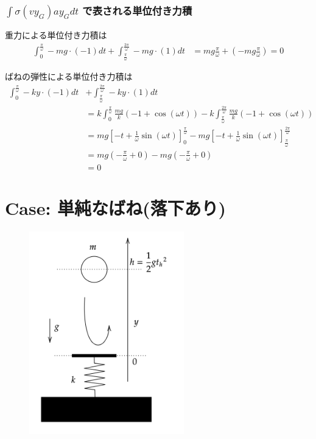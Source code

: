 \documentclass[a4paper,11pt]{jsarticle}
\begin{document}
\subsubsection{$\int\sigma (vy_G)ay_G dt$ で表される単位付き力積}
重力による単位付き力積は
\begin{align}
  \int_0^{\frac{\pi}{\omega}} -mg\cdot(-1) dt + \int_{\frac{\pi}{\omega}}^{\frac{2\pi}{\omega}} -mg\cdot(1) dt
   & = mg\frac{\pi}{\omega} + \left(-mg\frac{\pi}{\omega}\right) = 0
\end{align}

ばねの弾性による単位付き力積は
\begin{align}
  \int_0^{\frac{\pi}{\omega}} -ky\cdot(-1) dt
   & + \int_{\frac{\pi}{\omega}}^{\frac{2\pi}{\omega}} -ky\cdot(1) dt
  \\ &= k \int_0^{\frac{\pi}{\omega}} \frac{mg}{k}\left(-1+\cos(\omega t)\right)
  - k \int_{\frac{\pi}{\omega}}^{\frac{2\pi}{\omega}} \frac{mg}{k}\left(-1+\cos(\omega t)\right)
  \\&= mg \left[-t+\frac{1}{\omega}\sin(\omega t)\right]_0^{\frac{\pi}{\omega}}
  - mg \left[-t+\frac{1}{\omega}\sin(\omega t)\right]_{\frac{\pi}{\omega}}^{\frac{2\pi}{\omega}}
  \\&= mg \left( -\frac{\pi}{\omega} + 0 \right)
  - mg\left( -\frac{\pi}{\omega} + 0 \right)
  \\ &= 0
\end{align}


\section{Case: 単純なばね(落下あり)}

\begin{figure}[h]
  \centering
  \includegraphics[width = 0.6\textwidth]{fall_and_spring.png}
  \caption{}
  \label{fall_and_spring.png}
\end{figure}
\end{document}
